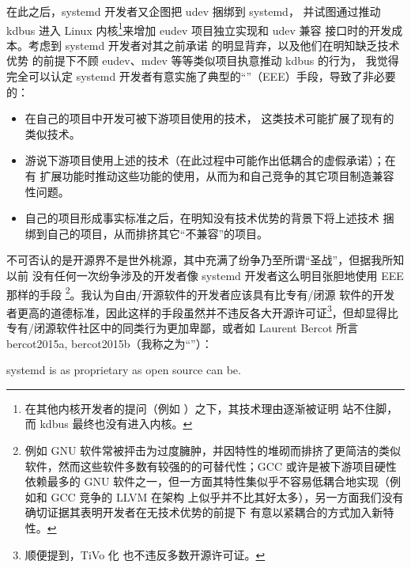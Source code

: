在此之后，systemd 开发者又企图把 udev 捆绑到 systemd，
并试图通过推动 kdbus 进入 Linux 内核\footnote{在其他内核开发者的提问（例如
\parencite{lutomirski2015}）之下，其技术理由逐渐被证明
站不住脚，而 kdbus 最终也没有进入内核。}来增加 eudev 项目独立实现和 udev 兼容
接口时的开发成本。考虑到 systemd 开发者对其之前承诺%
的明显背弃，以及他们在明知缺乏技术优势%
的前提下不顾 eudev、mdev 等等类似项目执意推动 kdbus 的行为，
我觉得完全可以认定 systemd 开发者有意实施了典型的“”（EEE）手段，导致了非必要的：
\begin{itemize}
\item 在自己的项目中开发可被下游项目使用的技术，
	这类技术可能扩展了现有的类似技术。
\item 游说下游项目使用上述的技术（在此过程中可能作出低耦合的虚假承诺）；在有
	扩展功能时推动这些功能的使用，从而为和自己竞争的其它项目制造兼容性问题。
\item 自己的项目形成事实标准之后，在明知没有技术优势的背景下将上述技术
	捆绑到自己的项目，从而排挤其它“不兼容”的项目。
\end{itemize}
不可否认的是开源界不是世外桃源，其中充满了纷争乃至所谓“圣战”，但据我所知以前
没有任何一次纷争涉及的开发者像 systemd 开发者这么明目张胆地使用 EEE 那样的手段%
\footnote{例如 GNU 软件常被抨击为过度臃肿，并因特性的堆砌而排挤了更简洁的类似
软件，然而这些软件多数有较强的的可替代性；GCC 或许是被下游项目硬性依赖最多的 GNU
软件之一，但一方面其特性集似乎不容易低耦合地实现（例如和 GCC 竞争的 LLVM 在架构
上似乎并不比其好太多），另一方面我们没有确切证据其表明开发者在无技术优势的前提下
有意以紧耦合的方式加入新特性。}。我认为自由/开源软件的开发者应该具有比专有/闭源
软件的开发者更高的道德标准，因此这样的手段虽然并不违反各大开源许可证\footnote%
{顺便提到，TiVo 化 也不违反多数开源许可证。}，但却显得比
专有/闭源软件社区中的同类行为更加卑鄙，或者如 Laurent Bercot 所言\cupercite%
{bercot2015a, bercot2015b}（我称之为“”）：
\begin{quoting}
	systemd is as proprietary as open source can be.
\end{quoting}

